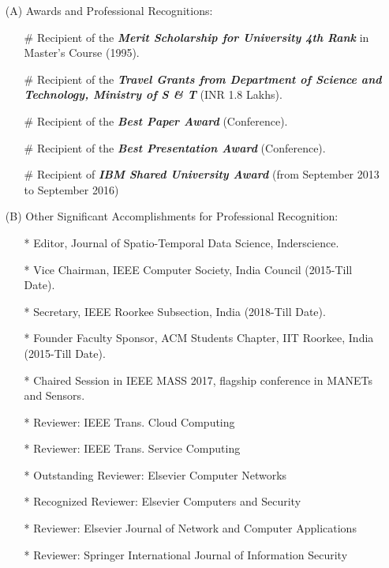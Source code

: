 \begin{itemize}
\item[(A)]  Awards and Professional Recognitions:

\begin{itemize}
	\item[\#]
	Recipient of the \emph{\textbf{Merit Scholarship for University 4th Rank}}
	in Master's Course (1995).
	
	\item[\#]
	Recipient of the \emph{\textbf{Travel Grants from Department of Science and Technology, Ministry of S \& T}}
	(INR 1.8 Lakhs).
	
	\item[\#]
	Recipient of the \emph{\textbf{Best Paper Award}} (Conference).
	
	\item[\#]
	Recipient of the \emph{\textbf{Best Presentation Award}} (Conference).

	\item[\#]
	Recipient of \textbf{\textit{IBM Shared University Award}} (from September 2013 to September 2016)
\end{itemize}

\item[(B)] Other Significant Accomplishments for Professional Recognition: 

\begin{itemize}
	\item[*] Editor, Journal of Spatio-Temporal Data Science, Inderscience.

	\item[*] Vice Chairman, IEEE Computer Society, India Council (2015-Till Date).

	\item[*] Secretary, IEEE Roorkee Subsection, India (2018-Till Date).

	\item[*] Founder Faculty Sponsor, ACM Students Chapter, IIT Roorkee, India (2015-Till Date).
	
	\item[*] Chaired Session in IEEE MASS 2017, flagship conference in MANETs and Sensors.
		
	\item[*] Reviewer: IEEE Trans. Cloud Computing
	
	\item[*] Reviewer: IEEE Trans. Service Computing
	
	\item[*] Outstanding Reviewer: Elsevier Computer Networks

	\item[*] Recognized Reviewer: Elsevier Computers and Security

	\item[*] Reviewer: Elsevier Journal of Network and Computer Applications
	
	\item[*] Reviewer: Springer International Journal of Information Security
	
	\end{itemize}
	
	
		\end{itemize}